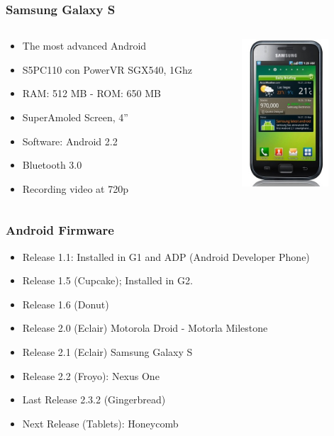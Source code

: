 \documentclass{beamer}
\begin{document}
\begin{frame}
\frametitle{Samsung Galaxy S}

\begin{columns}
\begin{column}{0.5\textwidth}

\begin{itemize}

\item The most advanced Android
\item S5PC110 con PowerVR SGX540, 1Ghz
\item RAM: 512 MB - ROM: 650 MB
\item SuperAmoled Screen, 4''
\item Software: Android 2.2
\item Bluetooth 3.0
\item Recording video at 720p
\end{itemize}
\end{column}

\begin{column}{0.5\textwidth}
\begin{center}
  \includegraphics[height=5.5cm]{figs/samsung-galaxy-s}
\end{center}
\end{column}
\end{columns}
\end{frame}


\begin {frame}
\frametitle{Android Firmware}

\begin{itemize}
\item Release 1.1: Installed in G1 and ADP (Android Developer Phone)
\item Release 1.5 (Cupcake); Installed in G2.
\item Release 1.6 (Donut)
\item Release 2.0 (Eclair) Motorola Droid - Motorla Milestone
\item Release 2.1 (Eclair) Samsung Galaxy S
\item Release 2.2 (Froyo): Nexus One
\item Last Release 2.3.2 (Gingerbread)
\item Next Release (Tablets): Honeycomb
\end{itemize}

\begin{center}
\end{center}

\end{frame}
\end{document}
